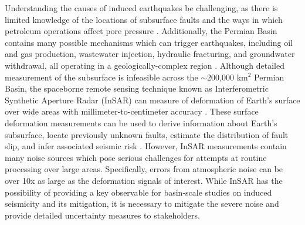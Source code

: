 \documentclass{utexasthesis}
\begin{document}

Understanding the causes of induced earthquakes be challenging, as there is limited knowledge of the locations of subsurface faults and the ways in which petroleum operations affect pore pressure \cite{Hennings2021StabilityFaultSystems}. Additionally, the Permian Basin contains many possible mechanisms which can trigger earthquakes, including oil and gas production, wastewater injection, hydraulic fracturing, and groundwater withdrawal, all operating in a geologically-complex region \cite{Smye2021VariationsVerticalStress}.
Although detailed measurement of the subsurface is infeasible across the $\sim$200,000 km$^2$ Permian Basin, the spaceborne remote sensing technique known as Interferometric Synthetic Aperture Radar (InSAR) can measure of deformation of Earth's surface over wide areas with millimeter-to-centimeter accuracy \citep{Massonnet1993DisplacementFieldLanders, Buergmann2000SyntheticApertureRadar}. These surface deformation measurements can be used to derive information about Earth's subsurface, locate previously unknown faults, estimate the distribution of fault slip, and infer associated seismic risk \citep{Segall2010EarthquakeVolcanoDeformation, Elliott2016RoleSpaceBased, Huang2017FaultGeometryInversion}.
However, InSAR measurements contain many noise sources which pose serious challenges for attempts at routine processing over large areas. Specifically, errors from atmospheric noise can be over 10x as large as the deformation signals of interest.
While InSAR has the possibility of providing a key observable for basin-scale studies on induced seismicity and its mitigation, it is necessary to mitigate the severe noise and provide detailed uncertainty measures to stakeholders.




 
 
\end{document}
